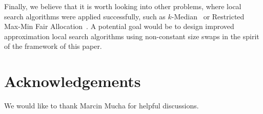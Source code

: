 \documentclass[11pt]{article}
\theoremstyle{definition}
\begin{document}
Finally, we believe that it is worth looking into 
other problems, where local search algorithms were
applied successfully, such as {\sc $k$-Median}~\cite{k-median}
or {\sc Restricted Max-Min Fair Allocation}~\cite{svensson}.
A potential goal would be to design improved approximation local search algorithms
using non-constant size swaps in the spirit of the framework of this paper.

\section*{Acknowledgements}

We would like to thank Marcin Mucha for helpful discussions.



\end{document}
